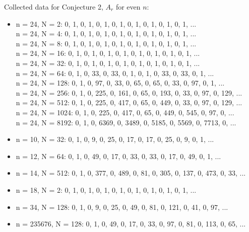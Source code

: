 \documentclass{article}
\begin{document}
\begin{flushleft}
    Collected data for Conjecture 2, $A_r$ for even $n$:
    \begin{itemize}
        \item n = 24, N = 2:  0, 1, 0, 1, 0, 1, 0, 1, 0, 1, 0, 1, 0, 1, 0, 1, ...
            \\ n = 24, N = 4:  0, 1, 0, 1, 0, 1, 0, 1, 0, 1, 0, 1, 0, 1, 0, 1, ...
            \\ n = 24, N = 8:  0, 1, 0, 1, 0, 1, 0, 1, 0, 1, 0, 1, 0, 1, 0, 1, ...
            \\ n = 24, N = 16:  0, 1, 0, 1, 0, 1, 0, 1, 0, 1, 0, 1, 0, 1, 0, 1, ...
            \\ n = 24, N = 32:  0, 1, 0, 1, 0, 1, 0, 1, 0, 1, 0, 1, 0, 1, 0, 1, ...
            \\ n = 24, N = 64:  0, 1, 0, 33, 0, 33, 0, 1, 0, 1, 0, 33, 0, 33, 0, 1, ...
            \\ n = 24, N = 128:  0, 1, 0, 97, 0, 33, 0, 65, 0, 65, 0, 33, 0, 97, 0, 1, ...
            \\ n = 24, N = 256:  0, 1, 0, 225, 0, 161, 0, 65, 0, 193, 0, 33, 0, 97, 0, 129, ...
            \\ n = 24, N = 512:  0, 1, 0, 225, 0, 417, 0, 65, 0, 449, 0, 33, 0, 97, 0, 129, ...
            \\ n = 24, N = 1024:  0, 1, 0, 225, 0, 417, 0, 65, 0, 449, 0, 545, 0, 97, 0, ...
            \\ n = 24, N = 8192:  0, 1, 0, 6369, 0, 3489, 0, 5185, 0, 5569, 0, 7713, 0, ...
        \item n = 10, N = 32:  0, 1, 0, 9, 0, 25, 0, 17, 0, 17, 0, 25, 0, 9, 0, 1, ...
        \item n = 12, N = 64:  0, 1, 0, 49, 0, 17, 0, 33, 0, 33, 0, 17, 0, 49, 0, 1, ...
        \item n = 14, N = 512:  0, 1, 0, 377, 0, 489, 0, 81, 0, 305, 0, 137, 0, 473, 0, 33, ...
        \item n = 18, N = 2:  0, 1, 0, 1, 0, 1, 0, 1, 0, 1, 0, 1, 0, 1, 0, 1, ...
        \item n = 34, N = 128:  0, 1, 0, 9, 0, 25, 0, 49, 0, 81, 0, 121, 0, 41, 0, 97, ...
        \item n = 235676, N = 128:  0, 1, 0, 49, 0, 17, 0, 33, 0, 97, 0, 81, 0, 113, 0, 65, ...
    \end{itemize}
    

\end{flushleft}
\end{document}
